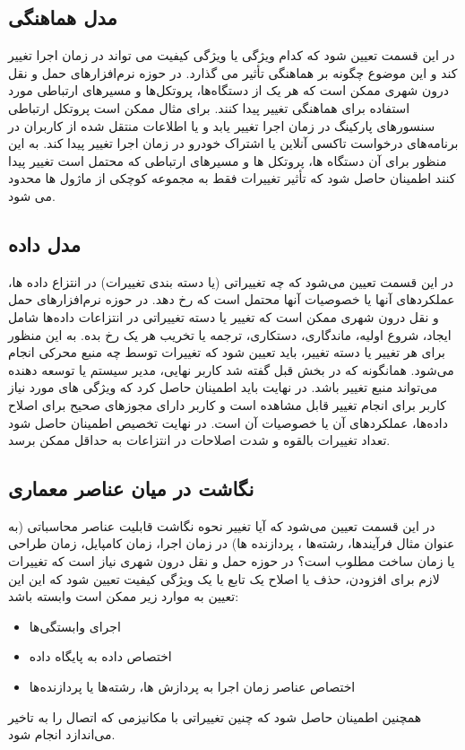 \subsection{مدل هماهنگی}
در این قسمت تعیین شود که کدام ویژگی یا ویژگی کیفیت می تواند در زمان اجرا تغییر کند و این موضوع چگونه بر هماهنگی تأثیر می گذارد. 
در حوزه نرم‌افزارهای حمل و نقل درون شهری ممکن است که هر یک از دستگاه‌ها، پروتکل‌ها و مسیرهای ارتباطی مورد استفاده برای هماهنگی تغییر پیدا کنند. برای مثال ممکن است پروتکل ارتباطی سنسورهای پارکینگ در زمان اجرا تغییر یابد و یا اطلاعات منتقل شده از کاربران در برنامه‌‌های درخواست تاکسی آنلاین یا اشتراک خودرو در زمان اجرا تغییر پیدا کند. به این منظور برای آن دستگاه ها، پروتکل ها و مسیرهای ارتباطی که محتمل است تغییر پیدا کنند اطمینان حاصل شود که تأثیر تغییرات فقط به مجموعه کوچکی از ماژول ها محدود می شود.
\subsection{مدل داده}
در این قسمت تعیین می‌شود که چه تغییراتی (یا دسته بندی تغییرات) در انتزاع داده ها، عملکردهای آنها یا خصوصیات آنها محتمل است که رخ دهد. در حوزه نرم‌افزارهای حمل و نقل درون شهری ممکن است که تغییر یا دسته تغییراتی در انتزاعات داده‌ها شامل ایجاد، شروع اولیه، ماندگاری، دستکاری، ترجمه یا تخریب هر یک رخ بده. به این منظور برای هر تغییر یا دسته تغییر، باید تعیین شود که تغییرات توسط چه منبع محرکی انجام می‌شود. همانگونه که در بخش قبل گفته شد کاربر نهایی، مدیر سیستم یا توسعه دهنده می‌تواند منبع تغییر باشد. در نهایت باید اطمینان حاصل کرد که ویژگی های مورد نیاز کاربر برای انجام تغییر قابل مشاهده است و  کاربر دارای مجوزهای صحیح برای اصلاح داده‌ها، عملکردهای آن یا خصوصیات آن است. در نهایت تخصیص اطمینان حاصل شود تعداد تغییرات بالقوه و شدت اصلاحات در انتزاعات به حداقل ممکن برسد.

\subsection{نگاشت در میان عناصر معماری}
در این قسمت تعیین می‌شود که آیا تغییر نحوه نگاشت قابلیت عناصر محاسباتی (به عنوان مثال فرآیندها، رشته‌ها ، پردازنده ها) در زمان اجرا، زمان کامپایل، زمان طراحی یا زمان ساخت مطلوب است؟
در حوزه حمل و نقل درون شهری نیاز است که تغییرات لازم برای افزودن، حذف یا اصلاح یک تابع یا یک ویژگی کیفیت تعیین شود که این این تعیین به موارد زیر ممکن است وابسته باشد:
\begin{itemize}
\item
اجرای وابستگی‌ها
\item
اختصاص داده به پایگاه داده
\item
اختصاص عناصر زمان اجرا به پردازش ها‌، رشته‌ها یا پردازنده‌ها
\end{itemize}
همچنین اطمینان حاصل شود که چنین تغییراتی با مکانیزمی که اتصال را به تاخیر می‌اندازد انجام شود.

